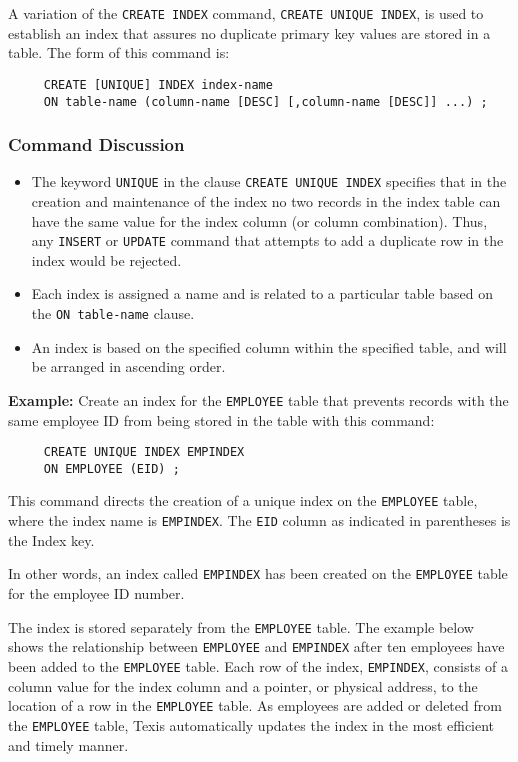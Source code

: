 A variation of the {\tt CREATE INDEX} command, {\tt CREATE UNIQUE INDEX}, is used
to establish an index that assures no duplicate primary key values are
stored in a table.  The form of this command is:

\begin{verbatim}
     CREATE [UNIQUE] INDEX index-name
     ON table-name (column-name [DESC] [,column-name [DESC]] ...) ;
\end{verbatim}

\subsubsection{Command Discussion}

\begin{itemize}

\item The keyword \verb`UNIQUE` in the clause {\tt CREATE UNIQUE INDEX}
specifies that in the creation and maintenance of the index no two
records in the index table can have the same value for the index
column (or column combination).  Thus, any \verb`INSERT` or
\verb`UPDATE` command that attempts to add a duplicate row in the
index would be rejected.

\item Each index is assigned a name and is related to a particular
table based on the {\tt ON table-name} clause.

\item An index is based on the specified column within the specified
table, and will be arranged in ascending order.
\end{itemize}

{\bf Example:}
Create an index for the \verb`EMPLOYEE` table that prevents records with the
same employee ID from being stored in the table with this command:
\begin{verbatim}
     CREATE UNIQUE INDEX EMPINDEX
     ON EMPLOYEE (EID) ;
\end{verbatim}

This command directs the creation of a unique index on the
\verb`EMPLOYEE` table, where the index name is
\verb`EMPINDEX`.  The \verb`EID` column as indicated in
parentheses is the Index key.

In other words, an index called \verb`EMPINDEX` has been created on the
\verb`EMPLOYEE` table for the employee ID number.

The index is stored separately from the \verb`EMPLOYEE` table.  The
example below shows the relationship between \verb`EMPLOYEE` and
\verb`EMPINDEX` after ten employees have been added to the \verb`EMPLOYEE`
table.  Each row of the index, \verb`EMPINDEX`, consists of a column value
for the index column and a pointer, or physical address, to the
location of a row in the \verb`EMPLOYEE` table.  As employees are added or
deleted from the \verb`EMPLOYEE` table, Texis automatically updates the index
in the most efficient and timely manner.

